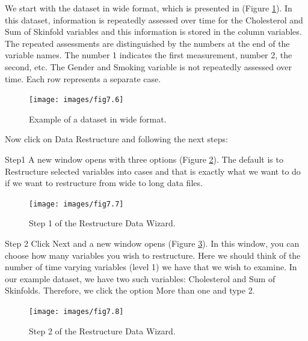 \documentclass[
]{book}
\begin{document}
We start with the dataset in wide format, which is presented in (Figure \ref{fig:fig76}). In this dataset, information is repeatedly assessed over time for the Cholesterol and Sum of Skinfold variables and this information is stored in the column variables. The repeated assessments are distinguished by the numbers at the end of the variable names. The number 1 indicates the first measurement, number 2, the second, etc. The Gender and Smoking variable is not repeatedly assessed over time. Each row represents a separate case.

\begin{figure}

{\centering \texttt{[image: images/fig7.6]} 

}

\caption{Example of a dataset in wide format.}\label{fig:fig76}
\end{figure}

Now click on Data Restructure and following the next steps:

Step1
A new window opens with three options (Figure \ref{fig:fig77}). The default is to Restructure selected variables into cases and that is exactly what we want to do if we want to restructure from wide to long data files.

\begin{figure}

{\centering \texttt{[image: images/fig7.7]} 

}

\caption{Step 1 of the Restructure Data Wizard.}\label{fig:fig77}
\end{figure}

Step 2
Click Next and a new window opens (Figure \ref{fig:fig78}). In this window, you can choose how many variables you wish to restructure. Here we should think of the number of time varying variables (level 1) we have that we wish to examine. In our example dataset, we have two such variables: Cholesterol and Sum of Skinfolds. Therefore, we click the option More than one and type 2.

\begin{figure}

{\centering \texttt{[image: images/fig7.8]} 

}

\caption{Step 2 of the Restructure Data Wizard.}\label{fig:fig78}
\end{figure}
\end{document}
